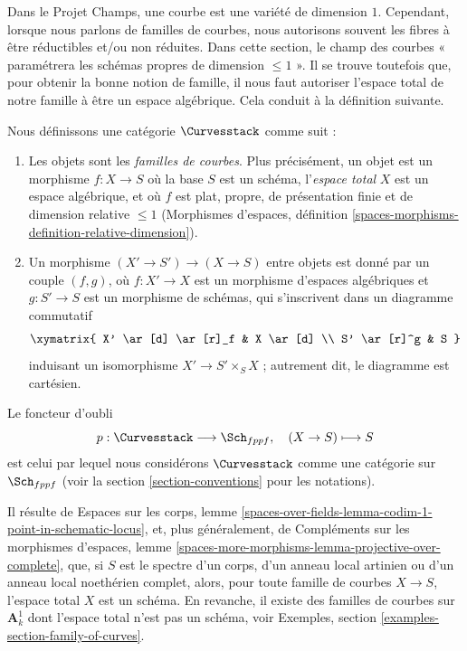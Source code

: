 \medskip\noindent
Dans le Projet Champs, une courbe est une variété de dimension $1$.
Cependant, lorsque nous parlons de familles de courbes, nous autorisons souvent
les fibres à être réductibles et/ou non réduites. Dans cette section, le champ
des courbes « paramétrera les schémas propres de dimension $\leq 1$ ».
Il se trouve toutefois que, pour obtenir la bonne notion de famille, il nous
faut autoriser l'espace total de notre famille à être un espace algébrique.
Cela conduit à la définition suivante.

\begin{situation}
\label{situation-curves}
Nous définissons une catégorie $\Curvesstack$ comme suit :
\begin{enumerate}
\item Les objets sont les {\it familles de courbes}. Plus précisément, un
objet est un morphisme $f : X \to S$ où la base $S$ est un schéma,
l'{\it espace total} $X$ est un espace algébrique, et où
$f$ est plat, propre, de présentation finie et de dimension relative
$\leq 1$ (Morphismes d'espaces, définition
\ref{spaces-morphisms-definition-relative-dimension}).
\item Un morphisme $(X' \to S') \to (X \to S)$ entre objets est donné par un
couple $(f, g)$, où $f : X' \to X$ est un morphisme d'espaces algébriques et
$g : S' \to S$ est un morphisme de schémas, qui s'inscrivent dans un diagramme
commutatif
$$
\xymatrix{
X' \ar[d] \ar[r]_f & X \ar[d] \\
S' \ar[r]^g & S
}
$$
induisant un isomorphisme $X' \to S' \times_S X$ ; autrement dit, le
diagramme est cartésien.
\end{enumerate}
Le foncteur d'oubli
$$
p : \Curvesstack \longrightarrow \Sch_{fppf},\quad
(X \to S) \longmapsto S
$$
est celui par lequel nous considérons $\Curvesstack$ comme une catégorie sur
$\Sch_{fppf}$
(voir la section \ref{section-conventions} pour les notations).
\end{situation}

\noindent
Il résulte de Espaces sur les corps, lemme
\ref{spaces-over-fields-lemma-codim-1-point-in-schematic-locus},
et, plus généralement, de
Compléments sur les morphismes d'espaces, lemme
\ref{spaces-more-morphisms-lemma-projective-over-complete},
que, si $S$ est le spectre d'un corps, d'un anneau local artinien ou d'un
anneau local noethérien complet, alors, pour toute famille de courbes
$X \to S$, l'espace total $X$ est un schéma.
En revanche, il existe des familles de courbes sur $\mathbf{A}^1_k$ dont
l'espace total n'est pas un schéma, voir
Exemples, section \ref{examples-section-family-of-curves}.

